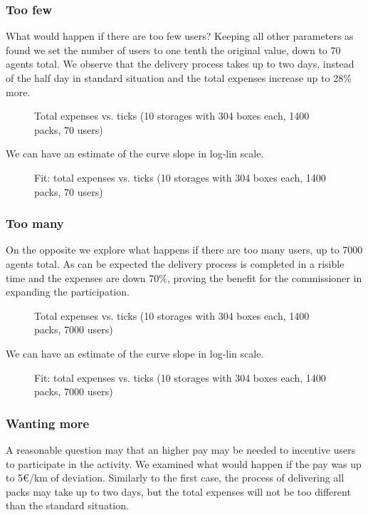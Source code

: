 \documentclass[11pt,a4paper]{article}
\begin{document}
\subsubsection*{Too few}
What would happen if there are too few users? 
Keeping all other parameters as found we set the number of users to one tenth the original value, down to 70 agents total.
We observe that the delivery process takes up to two days, instead of the half day in standard situation and the total expenses increase up to 28\% more.

\begin{figure}[h!]
\centering
\caption{Total expenses vs. ticks (10 storages with 304 boxes each, 1400 packs, 70 users)}
\end{figure}

We can have an estimate of the curve slope in log-lin scale.

\begin{figure}[h!]
\centering
\caption{Fit: total expenses vs. ticks (10 storages with 304 boxes each, 1400 packs, 70 users)}
\end{figure}

\newpage
\subsubsection*{Too many}
On the opposite we explore what happens if there are too many users, up to 7000 agents total.
As can be expected the delivery process is completed in a risible time and the expenses are down 70\%, proving the benefit for the commissioner in expanding the participation.

\begin{figure}[h!]
\centering
\caption{Total expenses vs. ticks (10 storages with 304 boxes each, 1400 packs, 7000 users)}
\end{figure}

We can have an estimate of the curve slope in log-lin scale.

\begin{figure}[h!]
\centering
\caption{Fit: total expenses vs. ticks (10 storages with 304 boxes each, 1400 packs, 7000 users)}
\end{figure}

\newpage
\subsubsection*{Wanting more}
A reasonable question may that an higher pay may be needed to incentive users to participate in the activity. 
We examined what would happen if the pay was up to 5\euro{}/km of deviation.
Similarly to the first case, the process of delivering all packs may take up to two days, but the total expenses will not be too different than the standard situation.
\end{document}
